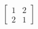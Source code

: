 \documentclass[preview]{standalone}
\begin{document}
\begin{align*}
\begin{bmatrix} 1 & 2 \\ 2 & 1 \end{bmatrix}
\end{align*}
\end{document}
